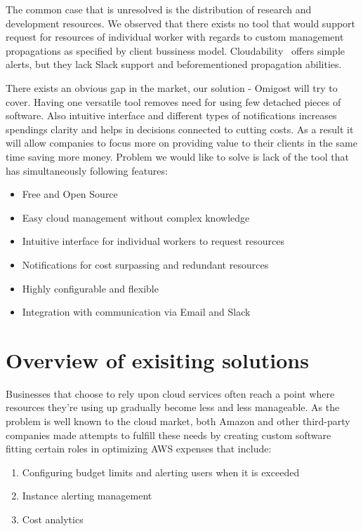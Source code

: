 \documentclass[licencjacka,en]{thesisclass}
\begin{document}
        The common case that is unresolved is the distribution of research and development resources.
        We observed that there exists no tool that would support request for resources of individual worker with regards to custom management propagations as specified by client bussiness model.
        Cloudability~\cite{CloudabilityAlerts} offers simple alerts, but they lack Slack support and beforementioned propagation abilities.

        There exists an obvious gap in the market, our solution - Omigost will try to cover. Having one versatile tool removes need for using few detached pieces of software. Also intuitive interface and different types of notifications increases spendings clarity and helps in decisions connected to cutting costs. As a result it will allow companies to focus more on providing value to their clients in the same time saving more money.
        Problem we would like to solve is lack of the tool that has simultaneously following features:
        \begin{itemize}
            \item Free and Open Source
            \item Easy cloud management without complex knowledge
            \item Intuitive interface for individual workers to request resources
            \item Notifications for cost surpassing and redundant resources
            \item Highly configurable and flexible
            \item Integration with communication via Email and Slack
        \end{itemize}

    \section{Overview of exisiting solutions}

        Businesses that choose to rely upon cloud services often reach a point where resources
	they’re using up gradually become less and less manageable. As the problem is well known
	to the cloud market, both Amazon and other third-party companies made attempts to fulfill
these needs by creating custom software fitting certain roles in optimizing AWS expenses that include:

        \begin{enumerate}
		\item Configuring budget limits and alerting users when it is exceeded
		\item Instance alerting management
		\item Cost analytics
        \end{enumerate}
\end{document}
